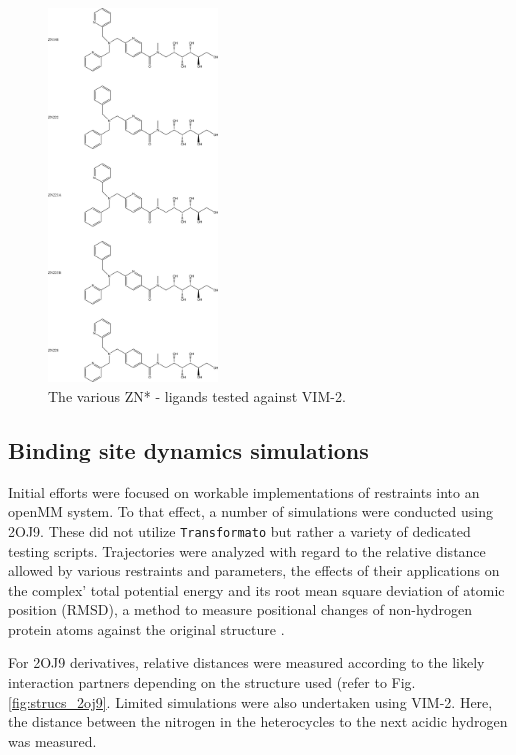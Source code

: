 \documentclass[oneside]{scrreprt}
\begin{document}
\begin{figure}\label{fig:strucs_vim2}
    \centering
    \includegraphics[width=0.4\textwidth]{vim2strucs.png}
    \caption[The various ZN* - ligands bound to VIM2] {The various ZN* - ligands tested against VIM-2.}
    
\end{figure}
\subsection{Binding site dynamics simulations}

Initial efforts were focused on workable implementations of restraints into an openMM system. To that effect, a number of simulations were conducted using 2OJ9. These did not utilize \texttt{Transformato} but rather a variety of dedicated testing scripts. Trajectories were analyzed with regard to the relative distance allowed by various restraints and parameters, the effects of their applications on the complex' total potential energy and its root mean square deviation of atomic position (RMSD), a method to measure positional changes of non-hydrogen protein atoms against the original structure \cite{yusuf_alternative_2008}.

For 2OJ9 derivatives, relative distances were measured according to the likely interaction partners depending on the structure used (refer to Fig. \ref{fig:strucs_2oj9}. Limited simulations were also undertaken using VIM-2. Here, the distance between the nitrogen in the heterocycles to the next acidic hydrogen was measured. 
\end{document}
